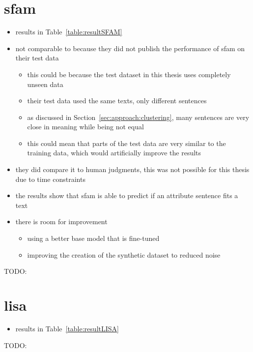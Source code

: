 \section{\acs{sfam}}
\begin{itemize}
  \item results in Table~\ref{table:resultSFAM}
  \item not comparable to \citet{patelLearningInterpretableStyle2023} because they did not publish the performance of \ac{sfam} on their test data
        \begin{itemize}
          \item this could be because the test dataset in this thesis uses completely unseen data
          \item their test data used the same texts, only different sentences
          \item as discussed in Section~\ref{sec:approach:clustering}, many sentences are very close in meaning while being not equal
          \item this could mean that parts of the test data are very similar to the training data, which would artificially improve the results
        \end{itemize}
  \item they did compare it to human judgments, this was not possible for this thesis due to time constraints
  \item the results show that \ac{sfam} is able to predict if an attribute sentence fits a text
  \item there is room for improvement
        \begin{itemize}
          \item using a better base model that is fine-tuned
          \item improving the creation of the synthetic dataset to reduced noise
        \end{itemize}
\end{itemize}

\begin{table}[ht]
  \resultSfam{}
  \caption{TODO:}
  \label{table:resultSFAM}
\end{table}


\section{\acs{lisa}}
\begin{itemize}
  \item results in Table~\ref{table:resultLISA}

\end{itemize}

\begin{table}[ht]
  \resultLisa{}
  \caption{TODO:}
  \label{table:resultLISA}
\end{table}